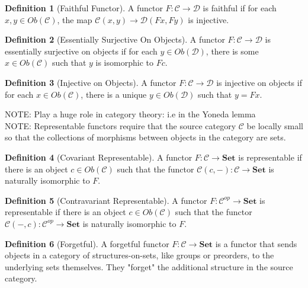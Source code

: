 \documentclass{article}
\theoremstyle{definition}
\newtheorem{definition}{Definition}
\begin{document}
\begin{definition}[Faithful Functor]
    A functor $F:\mathcal{C}\rightarrow\mathcal{D}$ is faithful if for each $x,y\in Ob(\mathcal{C})$, the map $\mathcal{C}(x, y)\rightarrow\mathcal{D}(Fx,Fy)$ is injective.
\end{definition}

\begin{definition}[Essentially Surjective On Objects]
    A functor $F:\mathcal{C}\rightarrow\mathcal{D}$ is essentially surjective on objects if for each $y\in Ob(\mathcal{D})$, there is some $x\in Ob(\mathcal{C})$ such that $y$ is isomorphic to $Fc$.
\end{definition}

\begin{definition}[Injective on Objects]
    A functor $F:\mathcal{C}\rightarrow\mathcal{D}$ is injective on objects if for each $x\in Ob(\mathcal{C})$, there is a unique $y\in Ob(\mathcal{D})$ such that $y=Fx$.
\end{definition}

NOTE: Play a huge role in category theory: i.e in the Yoneda lemma\\
NOTE: Representable functors require that the source category $\mathcal{C}$ be locally small so that the collections of morphisms between objects in the category are sets.
\begin{definition}[Covariant Representable]
    A functor $F:\mathcal{C}\rightarrow\mathbf{Set}$ is representable if there is an object $c\in Ob(\mathcal{C})$ such that the functor $\mathcal{C}(c,-):\mathcal{C}\rightarrow \mathbf{Set}$ is naturally isomorphic to $F$.
\end{definition}

\color{blue}
\begin{definition}[Contravariant Representable]
    A functor $F:\mathcal{C}^{op}\rightarrow\mathbf{Set}$ is representable if there is an object $c\in Ob(\mathcal{C})$ such that the functor $\mathcal{C}(-,c):\mathcal{C}^{op}\rightarrow \mathbf{Set}$ is naturally isomorphic to $F$.
\end{definition}
\color{black}

\begin{definition}[Forgetful]
    A forgetful functor $F:\mathcal{C}\rightarrow\mathbf{Set}$ is a functor that sends objects in a category of structures-on-sets, like groups or preorders, to the underlying sets themselves.
    They "forget" the additional structure in the source category.
\end{definition}
\end{document}
